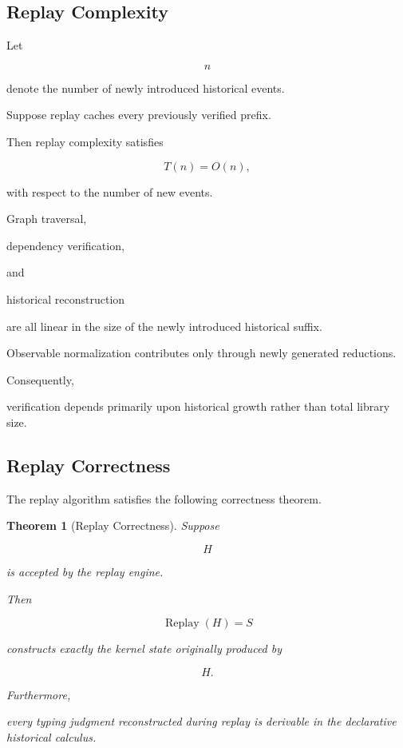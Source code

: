 \documentclass[12pt,oneside]{article}
\newtheorem{theorem}{Theorem}[section]
\theoremstyle{definition}
\theoremstyle{remark}
\DeclareMathOperator{\Replay}{Replay}
\begin{document}
\subsection{Replay Complexity}

Let

\[
n
\]

denote the number of newly introduced historical events.

Suppose replay caches every previously verified prefix.

Then replay complexity satisfies

\[
T(n)
=
O(n),
\]

with respect to the number of new events.

Graph traversal,

dependency verification,

and

historical reconstruction

are all linear in the size of the newly introduced historical suffix.

Observable normalization contributes only through newly generated reductions.

Consequently,

verification depends primarily upon historical growth rather than total library
size.


\subsection{Replay Correctness}

The replay algorithm satisfies the following correctness theorem.

\begin{theorem}[Replay Correctness]

Suppose

\[
H
\]

is accepted by the replay engine.

Then

\[
\Replay(H)
=
S
\]

constructs exactly the kernel state originally produced by

\[
H.
\]

Furthermore,

every typing judgment reconstructed during replay is derivable in the
declarative historical calculus.

\end{theorem}
\end{document}
